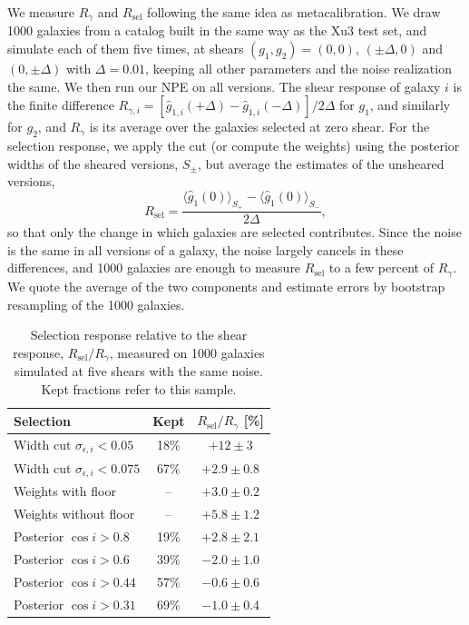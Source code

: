 We measure $R_\gamma$ and $R_\mathrm{sel}$ following the same idea as metacalibration. We draw 1000 galaxies from a catalog built in the same way as the Xu3 test set, and simulate each of them five times, at shears $(g_1, g_2) = (0, 0)$, $(\pm\Delta, 0)$ and $(0, \pm\Delta)$ with $\Delta = 0.01$, keeping all other parameters and the noise realization the same. We then run our NPE on all versions. The shear response of galaxy $i$ is the finite difference $R_{\gamma,i} = [\hat{g}_{1,i}(+\Delta) - \hat{g}_{1,i}(-\Delta)]/2\Delta$ for $g_1$, and similarly for $g_2$, and $R_\gamma$ is its average over the galaxies selected at zero shear. For the selection response, we apply the cut (or compute the weights) using the posterior widths of the sheared versions, $S_\pm$, but average the estimates of the unsheared versions,
\begin{equation}
\label{eqn:rsel}
    R_\mathrm{sel} = \frac{\langle \hat{g}_1(0) \rangle_{S_+} - \langle \hat{g}_1(0) \rangle_{S_-}}{2\Delta},
\end{equation}
so that only the change in which galaxies are selected contributes. Since the noise is the same in all versions of a galaxy, the noise largely cancels in these differences, and 1000 galaxies are enough to measure $R_\mathrm{sel}$ to a few percent of $R_\gamma$. We quote the average of the two components and estimate errors by bootstrap resampling of the 1000 galaxies.

\begin{table}
\centering
\caption{Selection response relative to the shear response, $R_\mathrm{sel}/R_\gamma$, measured on 1000 galaxies simulated at five shears with the same noise. Kept fractions refer to this sample.}
\label{tab:selection}
\begin{tabular}{lcc}
\toprule
Selection & Kept & $R_\mathrm{sel}/R_\gamma$ [\%] \\
\midrule
Width cut $\sigma_{\epsilon,i} < 0.05$ & 18\% & $+12 \pm 3$ \\
Width cut $\sigma_{\epsilon,i} < 0.075$ & 67\% & $+2.9 \pm 0.8$ \\
Weights with floor & -- & $+3.0 \pm 0.2$ \\
Weights without floor & -- & $+5.8 \pm 1.2$ \\
Posterior $\cos i > 0.8$ & 19\% & $+2.8 \pm 2.1$ \\
Posterior $\cos i > 0.6$ & 39\% & $-2.0 \pm 1.0$ \\
Posterior $\cos i > 0.44$ & 57\% & $-0.6 \pm 0.6$ \\
Posterior $\cos i > 0.31$ & 69\% & $-1.0 \pm 0.4$ \\
\bottomrule
\end{tabular}
\end{table}

